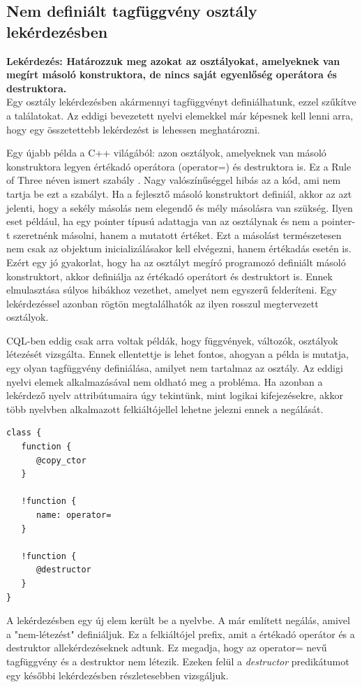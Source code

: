 \documentclass[a4paper,12pt]{report}
\begin{document}
\subsection{Nem definiált tagfüggvény osztály lekérdezésben}
\textbf{Lekérdezés: Határozzuk meg azokat az osztályokat, amelyeknek van megírt másoló konstruktora, de nincs saját egyenlőség operátora és destruktora.}
\\
Egy osztály lekérdezésben akármennyi tagfüggvényt definiálhatunk, ezzel szűkítve a találatokat. Az eddigi bevezetett nyelvi elemekkel már képesnek kell lenni arra, hogy egy összetettebb lekérdezést is lehessen meghatározni.
\par Egy újabb példa a C++ világából: azon osztályok, amelyeknek van másoló konstruktora legyen értékadó operátora (operator=) és destruktora is. Ez a Rule of Three néven ismert szabály \cite{rule_of_three}. Nagy valószínűséggel hibás az a kód, ami nem tartja be ezt a szabályt. Ha a fejlesztő másoló konstruktort definiál, akkor az azt jelenti, hogy a sekély másolás nem elegendő és mély másolásra van szükség. Ilyen eset például, ha egy pointer típusú adattagja van az osztálynak és nem a pointer-t szeretnénk másolni, hanem a mutatott értéket. Ezt a másolást természetesen nem csak az objektum inicializálásakor kell elvégezni, hanem értékadás esetén is. Ezért egy jó gyakorlat, hogy ha az osztályt megíró programozó definiált másoló konstruktort, akkor definiálja az értékadó operátort és destruktort is. Ennek elmulasztása súlyos hibákhoz vezethet, amelyet nem egyszerű felderíteni. Egy lekérdezéssel azonban rögtön megtalálhatók az ilyen rosszul megtervezett osztályok.
\par CQL-ben eddig csak arra voltak példák, hogy függvények, változók, osztályok létezését vizsgálta. Ennek ellentettje is lehet fontos, ahogyan a példa is mutatja, egy olyan tagfüggvény definiálása, amilyet nem tartalmaz az osztály. Az eddigi nyelvi elemek alkalmazásával nem oldható meg a probléma. Ha azonban a lekérdező nyelv attribútumaira úgy tekintünk, mint logikai kifejezésekre, akkor több nyelvben alkalmazott felkiáltójellel lehetne jelezni ennek a negálását.
\begin{verbatim}
class {
   function { 
      @copy_ctor
   }
   
   !function {
      name: operator=
   }
   
   !function {
      @destructor
   }
}
\end{verbatim}
\par A lekérdezésben egy új elem került be a nyelvbe. A már említett negálás, amivel a "nem-létezést" definiáljuk. Ez a felkiáltójel prefix, amit a értékadó operátor és a destruktor allekérdezéseknek  adtunk. Ez megadja, hogy az operator= nevű tagfüggvény és a destruktor nem létezik. Ezeken felül a \textit{destructor} predikátumot egy későbbi lekérdezésben részletesebben vizsgáljuk.
\end{document}
